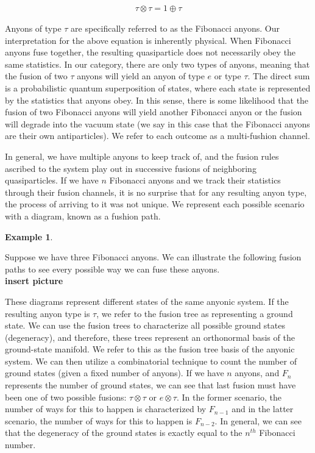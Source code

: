 \documentclass[10pt]{ucthesis}
\newtheorem{example}[definition]{Example}
\begin{document}
\begin{equation}
	\begin{aligned}
		\tau \otimes \tau = 1\oplus \tau
	\end{aligned}
\end{equation}

Anyons of type $\tau$ are specifically referred to as the Fibonacci anyons. Our interpretation for the above equation is inherently physical. When Fibonacci anyons fuse together, the resulting quasiparticle does not necessarily obey the same statistics. In our category, there are only two types of anyons, meaning that the fusion of two $\tau$ anyons will yield an anyon of type $e$ or type $\tau$. The direct sum is a probabilistic quantum superposition of states, where each state is represented by the statistics that anyons obey. In this sense, there is some likelihood that the fusion of two Fibonacci anyons will yield another Fibonacci anyon or the fusion will degrade into the vacuum state (we say in this case that the Fibonacci anyons are their own antiparticles). We refer to each outcome as a multi-fushion channel.

In general, we have multiple anyons to keep track of, and the fusion rules ascribed to the system play out in successive fusions of neighboring quasiparticles. If we have $n$ Fibonacci anyons and we track their statistics through their fusion channels, it is no surprise that for any resulting anyon type, the process of arriving to it was not unique. We represent each possible scenario with a diagram, known as a fushion path.

\begin{example}\end{example} 
Suppose we have three Fibonacci anyons. We can illustrate the following fusion paths to see every possible way we can fuse these anyons.\\

\textbf{insert picture}


These diagrams represent different states of the same anyonic system. If the resulting anyon type is $\tau$, we refer to the fusion tree as representing a ground state. We can use the fusion trees to characterize all possible ground states (degeneracy), and therefore, these trees represent an orthonormal basis of the ground-state manifold\cite{Trebst}. We refer to this as the fusion tree basis of the anyonic system. We can then utilize a combinatorial technique to count the number of ground states (given a fixed number of anyons). If we have $n$ anyons, and $F_n$ represents the number of ground states, we can see that last fusion must have been one of two possible fusions: $\tau\otimes \tau$ or $e \otimes \tau$. In the former scenario, the number of ways for this to happen is characterized by $F_{n-1}$ and in the latter scenario, the number of ways for this to happen is $F_{n-2}$. In general, we can see that the degeneracy of the ground states is exactly equal to the $n^{th}$ Fibonacci number.
\end{document}
